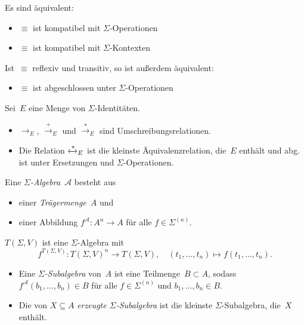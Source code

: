\documentclass{cheat-sheet}
\newcommand{\reducesTo}{\xrightarrow{*}}
\newcommand{\strictlyReducesTo}{\xrightarrow{+}}
\newcommand{\zzEq}{\xleftrightarrow{*}} %
\renewcommand{\Alg}{\mathcal{A}} %
\begin{document}
\begin{lem}
  Es sind äquivalent:
  \begin{itemize}
    \item $\equiv$ ist kompatibel mit $\Sigma$-Operationen
    \item $\equiv$ ist kompatibel mit $\Sigma$-Kontexten
  \end{itemize}
  Ist~$\equiv$ reflexiv und transitiv, so ist außerdem äquivalent:
  \begin{itemize}
    \item $\equiv$ ist abgeschlossen unter $\Sigma$-Operationen
  \end{itemize}
\end{lem}

\begin{thm}
  Sei~$E$ eine Menge von $\Sigma$-Identitäten.
  \begin{itemize}
    \item ${\to_E}$, ${\strictlyReducesTo_E}$ und ${\reducesTo_E}$ sind Umschreibungsrelationen.
    \item Die Relation $\zzEq_E$ ist die kleinste Äquivalenzrelation, die~$E$ enthält und abg. ist unter Ersetzungen und $\Sigma$-Operationen.
  \end{itemize}
\end{thm}


\begin{defn}
  Eine \emph{$\Sigma$-Algebra}~$\Alg$ besteht aus
  \begin{itemize}
    \item einer \textit{Trägermenge}~$A$ und
    \item einer Abbildung $f^\Alg : A^n \to A$ für alle $f \in \Sigma^{(n)}$.
  \end{itemize}
\end{defn}

\begin{bsp}
  $T(\Sigma, V)$ ist eine $\Sigma$-Algebra mit
  \[
    f^{T(\Sigma, V)} : T(\Sigma, V)^n \to T(\Sigma, V), \quad
    (t_1, \ldots, t_n) \mapsto f(t_1, \ldots, t_n).
  \]
\end{bsp}

\begin{defn}
  \begin{itemize}
    \item Eine \emph{$\Sigma$-Subalgebra} von~$A$ ist eine Teilmenge~$B \subset A$, sodass $f^\Alg(b_1, \ldots, b_n) \in B$ für alle $f \in \Sigma^{(n)}$ und $b_1, \ldots, b_n \in B$.
    \item Die von $X \subseteq A$ \emph{erzeugte $\Sigma$-Subalgebra} ist die kleinste $\Sigma$-Subalgebra, die~$X$ enthält.
  \end{itemize}
\end{defn}
\end{document}
